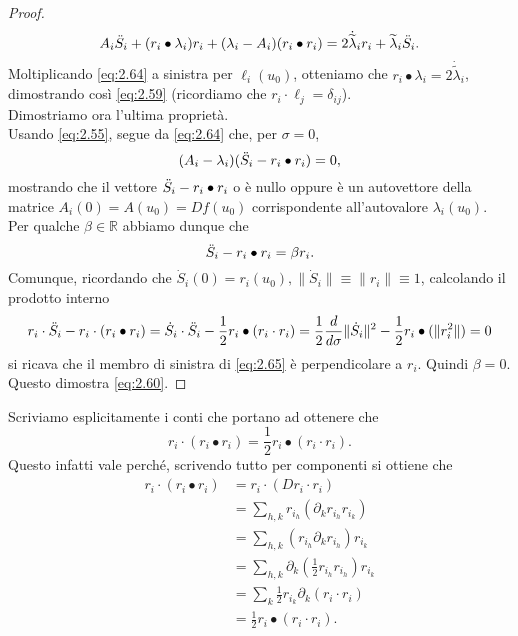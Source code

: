 \begin{proof}
    \begin{equation}\label{eq:2.64}
        A_{i}\Ddot{S}_{i}+(r_{i}\bullet\lambda_{i})r_{i}+(\lambda_{i}-A_{i})(r_{i}\bullet r_{i})=2\dot{\widetilde{\lambda}}_{i}r_{i}+\widetilde{\lambda}_{i}\Ddot{S}_{i}.
    \end{equation}
    Moltiplicando \eqref{eq:2.64} a sinistra per $\ell_{i}(u_{0})$, otteniamo che $r_{i}\bullet\lambda_{i}=2\dot{\widetilde{\lambda}}_{i}$, dimostrando così \eqref{eq:2.59} (ricordiamo che $r_{i}\cdot\ell_{j}=\delta_{ij}$).\\
    Dimostriamo ora l'ultima proprietà.\\
    Usando \eqref{eq:2.55}, segue da \eqref{eq:2.64} che, per $\sigma =0$,
    \begin{equation*}
        (A_{i}-\lambda_{i})(\Ddot{S}_{i}-r_{i}\bullet r_{i})=0,
    \end{equation*}
    mostrando che il vettore $\Ddot{S}_{i}-r_{i}\bullet r_{i}$ o è nullo oppure è un autovettore della matrice $A_{i}(0)=A(u_{0})=Df(u_{0})$ corrispondente all'autovalore $\lambda_{i}(u_{0})$. Per qualche $\beta\in\mathbb{R}$ abbiamo dunque che
    \begin{equation}\label{eq:2.65}
        \Ddot{S}_{i}-r_{i}\bullet r_{i}=\beta r_{i}.
    \end{equation}
    Comunque, ricordando che $\dot{S}_{i}(0)=r_{i}(u_{0}), \|\dot{S}_{i}\|\equiv\|r_{i}\|\equiv 1$, calcolando il prodotto interno
    \begin{equation*}
        r_{i}\cdot\Ddot{S}_{i}-r_{i}\cdot (r_{i}\bullet r_{i}) = \dot{S}_{i}\cdot\Ddot{S}_{i}-\frac{1}{2}r_{i}\bullet (r_{i}\cdot r_{i}) = \frac{1}{2}\frac{d}{d\sigma}\|\dot{S}_{i}\|^{2}-\frac{1}{2}r_{i}\bullet (\|r_{i}^{2}\|)=0
    \end{equation*}
    si ricava che il membro di sinistra di \eqref{eq:2.65} è perpendicolare a $r_{i}$. Quindi $\beta = 0$. Questo dimostra \eqref{eq:2.60}.
\end{proof}
\begin{osservazione}
    Scriviamo esplicitamente i conti che portano ad ottenere che
    $$r_{i}\cdot (r_{i}\bullet r_{i})=\frac{1}{2}r_{i}\bullet (r_{i}\cdot r_{i}).$$
    Questo infatti vale perché, scrivendo tutto per componenti si ottiene che
    \begin{align*}
        r_{i}\cdot(r_{i}\bullet r_{i}) &= r_{i}\cdot(Dr_{i}\cdot r_{i})\\
        &=\sum_{h,k}r_{i_{h}}(\partial_{k}r_{i_{h}} r_{i_{k}})\\
        &=\sum_{h,k}(r_{i_{h}}\partial_{k}r_{i_{h}})r_{i_{k}}\\
        &=\sum_{h,k}\partial_{k}(\frac{1}{2}r_{i_{h}}r_{i_{h}})r_{i_{k}}\\
        &=\sum_{k}\frac{1}{2}r_{i_{k}}\partial_{k}(r_{i}\cdot r_{i})\\
        &=\frac{1}{2}r_{i}\bullet(r_{i}\cdot r_{i}).
    \end{align*}
\end{osservazione}
